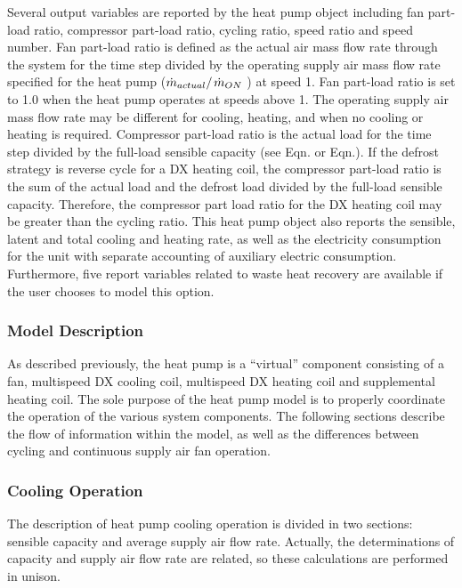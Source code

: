 Several output variables are reported by the heat pump object including fan part-load ratio, compressor part-load ratio, cycling ratio, speed ratio and speed number. Fan part-load ratio is defined as the actual air mass flow rate through the system for the time step divided by the operating supply air mass flow rate specified for the heat pump (\({{{{\dot m}_{actual}}} \mathord{\left/ {\vphantom {{{{\dot m}_{actual}}} {{{\dot m}_{design}}}}} \right. } {{{\dot m}_{ON}}}}\) ) at speed 1. Fan part-load ratio is set to 1.0 when the heat pump operates at speeds above 1. The operating supply air mass flow rate may be different for cooling, heating, and when no cooling or heating is required. Compressor part-load ratio is the actual load for the time step divided by the full-load sensible capacity (see Eqn. or Eqn.). If the defrost strategy is reverse cycle for a DX heating coil, the compressor part-load ratio is the sum of the actual load and the defrost load divided by the full-load sensible capacity. Therefore, the compressor part load ratio for the DX heating coil may be greater than the cycling ratio. This heat pump object also reports the sensible, latent and total cooling and heating rate, as well as the electricity consumption for the unit with separate accounting of auxiliary electric consumption. Furthermore, five report variables related to waste heat recovery are available if the user chooses to model this option.

\subsubsection{Model Description}\label{model-description-4}

As described previously, the heat pump is a ``virtual'' component consisting of a fan, multispeed DX cooling coil, multispeed DX heating coil and supplemental heating coil. The sole purpose of the heat pump model is to properly coordinate the operation of the various system components. The following sections describe the flow of information within the model, as well as the differences between cycling and continuous supply air fan operation.

\subsubsection{Cooling Operation}\label{cooling-operation-2}

The description of heat pump cooling operation is divided in two sections: sensible capacity and average supply air flow rate. Actually, the determinations of capacity and supply air flow rate are related, so these calculations are performed in unison.


